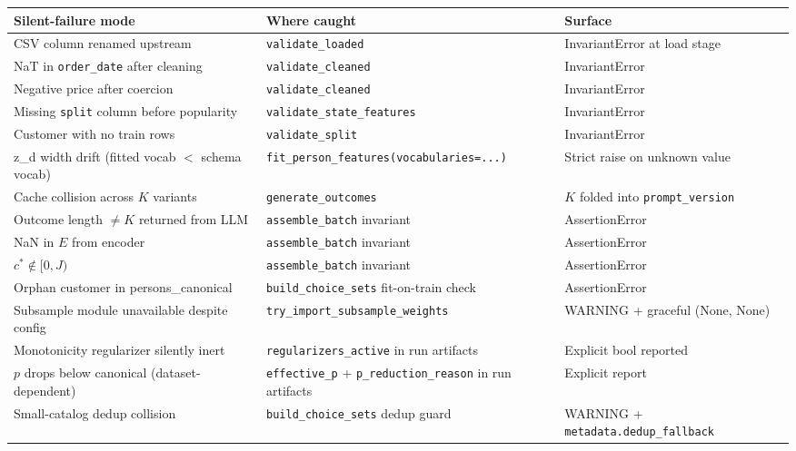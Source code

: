 \documentclass[11pt,a4paper]{article}
\begin{document}
\begin{center}
\small
\begin{tabular}{@{}p{} p{} p{}@{}}
\toprule
Silent-failure mode & Where caught & Surface \\
\midrule
CSV column renamed upstream & \texttt{validate\_loaded} & InvariantError at load stage \\
NaT in \texttt{order\_date} after cleaning & \texttt{validate\_cleaned} & InvariantError \\
Negative price after coercion & \texttt{validate\_cleaned} & InvariantError \\
Missing \texttt{split} column before popularity & \texttt{validate\_state\_features} & InvariantError \\
Customer with no train rows & \texttt{validate\_split} & InvariantError \\
z\_d width drift (fitted vocab $<$ schema vocab) & \texttt{fit\_person\_features(vocabularies=...)} & Strict raise on unknown value \\
Cache collision across $K$ variants & \texttt{generate\_outcomes} & $K$ folded into \texttt{prompt\_version} \\
Outcome length $\ne K$ returned from LLM & \texttt{assemble\_batch} invariant & AssertionError \\
NaN in $E$ from encoder & \texttt{assemble\_batch} invariant & AssertionError \\
$c^* \not\in [0, J)$ & \texttt{assemble\_batch} invariant & AssertionError \\
Orphan customer in persons\_canonical & \texttt{build\_choice\_sets} fit-on-train check & AssertionError \\
Subsample module unavailable despite config & \texttt{try\_import\_subsample\_weights} & WARNING + graceful (None, None) \\
Monotonicity regularizer silently inert & \texttt{regularizers\_active} in run artifacts & Explicit bool reported \\
$p$ drops below canonical (dataset-dependent) & \texttt{effective\_p} + \texttt{p\_reduction\_reason} in run artifacts & Explicit report \\
Small-catalog dedup collision & \texttt{build\_choice\_sets} dedup guard & WARNING + \texttt{metadata.dedup\_fallback} \\
\bottomrule
\end{tabular}
\end{center}
\end{document}
